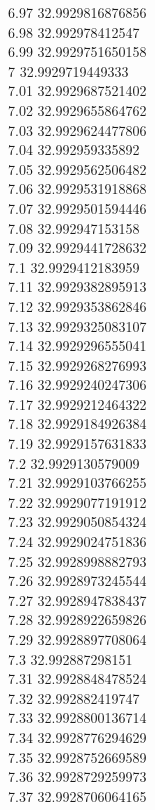 {6.97	32.9929816876856\\
6.98	32.992978412547\\
6.99	32.9929751650158\\
7	32.9929719449333\\
7.01	32.9929687521402\\
7.02	32.9929655864762\\
7.03	32.9929624477806\\
7.04	32.992959335892\\
7.05	32.9929562506482\\
7.06	32.9929531918868\\
7.07	32.9929501594446\\
7.08	32.992947153158\\
7.09	32.9929441728632\\
7.1	32.9929412183959\\
7.11	32.9929382895913\\
7.12	32.9929353862846\\
7.13	32.9929325083107\\
7.14	32.9929296555041\\
7.15	32.9929268276993\\
7.16	32.9929240247306\\
7.17	32.9929212464322\\
7.18	32.9929184926384\\
7.19	32.9929157631833\\
7.2	32.9929130579009\\
7.21	32.9929103766255\\
7.22	32.9929077191912\\
7.23	32.9929050854324\\
7.24	32.9929024751836\\
7.25	32.9928998882793\\
7.26	32.9928973245544\\
7.27	32.9928947838437\\
7.28	32.9928922659826\\
7.29	32.9928897708064\\
7.3	32.992887298151\\
7.31	32.9928848478524\\
7.32	32.992882419747\\
7.33	32.9928800136714\\
7.34	32.9928776294629\\
7.35	32.9928752669589\\
7.36	32.9928729259973\\
7.37	32.9928706064165\\
}
